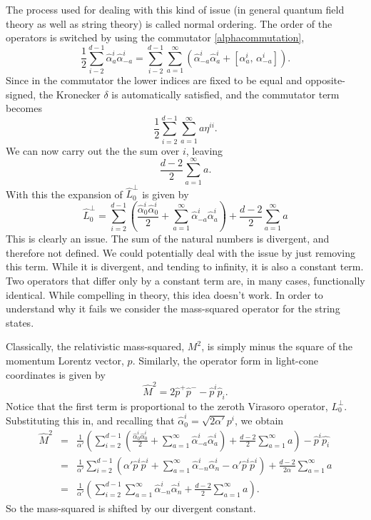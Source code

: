 \documentclass[a4paper,12pt]{article}
\numberwithin{equation}{section}
\begin{document}
The process used for dealing with this kind of issue (in general quantum field theory as well as string theory) is called normal ordering. The order of the operators is switched by using the commutator \ref{alphacommutation},
\begin{equation}
\frac{1}{2}\sum_{i-2}^{d-1}\hat{\alpha}_a^i\hat{\alpha}_{-a}^i = \sum_{i-2}^{d-1}\sum_{a=1}^\infty\left(\hat{\alpha}_{-a}^i\hat{\alpha}_a^i + \left[\alpha_a^i,\,\alpha_{-a}^i\right]\right).
\end{equation} 
Since in the commutator the lower indices are fixed to be equal and opposite-signed, the Kronecker $\delta$ is automatically satisfied, and the commutator term becomes
\begin{equation}
\frac{1}{2}\sum_{i=2}^{d-1}\sum_{a=1}^\infty a\eta^{ii}.
\end{equation}
We can now carry out the the sum over $i$, leaving
\begin{equation}
\frac{d-2}{2}\sum_{a=1}^\infty a.
\end{equation} 
With this the expansion of $\hat{L}_0^\perp$ is given by
\begin{equation}
\hat{L}_0^\perp = \sum_{i=2}^{d-1}\left(\frac{\hat{\alpha}_0^i\hat{\alpha}_0^i}{2} + \sum_{a=1}^\infty\hat{\alpha}_{-a}^i\hat{\alpha}_a^i\right) + \frac{d-2}{2}\sum_{a=1}^\infty a
\end{equation}
This is clearly an issue. The sum of the natural numbers is divergent, and therefore not defined. We could potentially deal with the issue by just removing this term. While it is divergent, and tending to infinity, it is also a constant term. Two operators that differ only by a constant term are, in many cases, functionally identical. While compelling in theory, this idea doesn't work. In order to understand why it fails we consider the mass-squared operator for the string states.

Classically, the relativistic mass-squared, $M^2$, is simply minus the square of the momentum Lorentz vector, $p$. Similarly, the operator form in light-cone coordinates is given by
\begin{equation}
\hat{M}^2 = 2\hat{p}^+\hat{p}^- - \hat{p}^i\hat{p}_i.
\end{equation}
Notice that the first term is proportional to the zeroth Virasoro operator, $L_0^\perp$. Substituting this in, and recalling that $\hat{\alpha}_0^i = \sqrt{2\alpha'}p^i$, we obtain
\begin{eqnarray}
\hat{M}^2 &=& \frac{1}{\alpha'}\left(\sum_{i=2}^{d-1}\left(\frac{\hat{\alpha}_0^i\hat{\alpha}_0^i}{2} + \sum_{a=1}^\infty\hat{\alpha}_{-a}^i\hat{\alpha}_a^i\right) + \frac{d-2}{2}\sum_{a=1}^\infty a\right) - \hat{p}^i\hat{p_i}\\
&=&\frac{1}{\alpha'}\sum_{i=2}^{d-1}\left(\alpha'\hat{p}^i\hat{p}^i + \sum_{a=1}^\infty\hat{\alpha}_{-n}^i\hat{\alpha}_n^i-\alpha'\hat{p}^i\hat{p}^i\right) + \frac{d-2}{2\alpha}\sum_{a=1}^\infty a\\
&=& \frac{1}{\alpha'}\left(\sum_{i=2}^{d-1}\sum_{a=1}^\infty\hat{\alpha}_{-n}^i\hat{\alpha}_n^i + \frac{d-2}{2}\sum_{a=1}^\infty a\right).
\end{eqnarray}
So the mass-squared is shifted by our divergent constant. 
\end{document}
